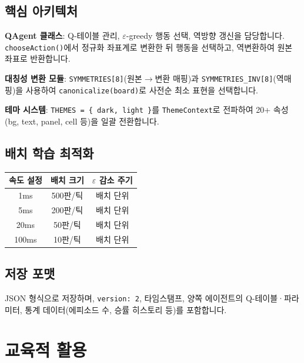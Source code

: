 \documentclass[11pt,a4paper]{article}
\begin{document}
\subsection{핵심 아키텍처}

\textbf{QAgent 클래스}: Q-테이블 관리, $\varepsilon$-greedy 행동 선택, 역방향 갱신을 담당합니다. \texttt{chooseAction()}에서 정규화 좌표계로 변환한 뒤 행동을 선택하고, 역변환하여 원본 좌표로 반환합니다.

\textbf{대칭성 변환 모듈}: \texttt{SYMMETRIES[8]}(원본$\to$변환 매핑)과 \texttt{SYMMETRIES\_INV[8]}(역매핑)을 사용하여 \texttt{canonicalize(board)}로 사전순 최소 표현을 선택합니다.

\textbf{테마 시스템}: \texttt{THEMES = \{ dark, light \}}를 \texttt{ThemeContext}로 전파하여 20+ 속성(bg, text, panel, cell 등)을 일괄 전환합니다.

\subsection{배치 학습 최적화}

\begin{center}
\renewcommand{\arraystretch}{1.4}
\begin{tabular}{|c|c|c|}
\hline
\rowcolor{tableheader}
\textbf{속도 설정} & \textbf{배치 크기} & \textbf{$\varepsilon$ 감소 주기} \\
\hline
1ms & 500판/틱 & 배치 단위 \\
\hline
5ms & 200판/틱 & 배치 단위 \\
\hline
20ms & 50판/틱 & 배치 단위 \\
\hline
100ms & 10판/틱 & 배치 단위 \\
\hline
\end{tabular}
\end{center}

\subsection{저장 포맷}

JSON 형식으로 저장하며, \texttt{version: 2}, 타임스탬프, 양쪽 에이전트의 Q-테이블·파라미터, 통계 데이터(에피소드 수, 승률 히스토리 등)를 포함합니다.

\section{교육적 활용}
\end{document}

